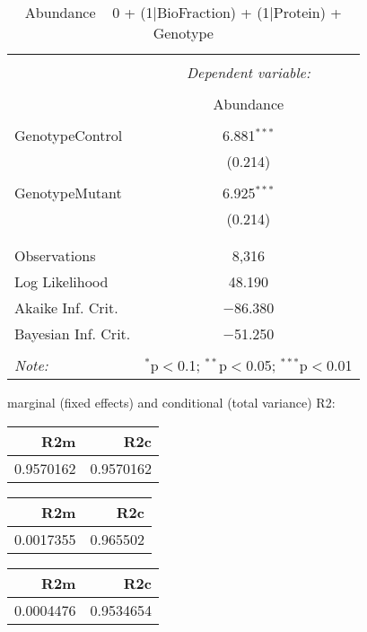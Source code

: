 \documentclass[11pt]{report}
\begin{document}
\begin{table}[!htbp] \centering 
  \caption{Abundance ~ 0 + (1|BioFraction) + (1|Protein) + Genotype} 
  \label{} 
\begin{tabular}{@{\extracolsep{5pt}}lc} 
\\[-1.8ex]\hline 
\hline \\[-1.8ex] 
 & \multicolumn{1}{c}{\textit{Dependent variable:}} \\ 
\cline{2-2} 
\\[-1.8ex] & Abundance \\ 
\hline \\[-1.8ex] 
 GenotypeControl & 6.881$^{***}$ \\ 
  & (0.214) \\ 
  & \\ 
 GenotypeMutant & 6.925$^{***}$ \\ 
  & (0.214) \\ 
  & \\ 
\hline \\[-1.8ex] 
Observations & 8,316 \\ 
Log Likelihood & 48.190 \\ 
Akaike Inf. Crit. & $-$86.380 \\ 
Bayesian Inf. Crit. & $-$51.250 \\ 
\hline 
\hline \\[-1.8ex] 
\textit{Note:}  & \multicolumn{1}{r}{$^{*}$p$<$0.1; $^{**}$p$<$0.05; $^{***}$p$<$0.01} \\ 
\end{tabular} 
\end{table} 
marginal (fixed effects) and conditional (total variance) R2:

\begin{tabular}{r|r}
\hline
R2m & R2c\\
\hline
0.9570162 & 0.9570162\\
\hline
\end{tabular}

\begin{tabular}{r|r}
\hline
R2m & R2c\\
\hline
0.0017355 & 0.965502\\
\hline
\end{tabular}

\begin{tabular}{r|r}
\hline
R2m & R2c\\
\hline
0.0004476 & 0.9534654\\
\hline
\end{tabular}
\end{document}
